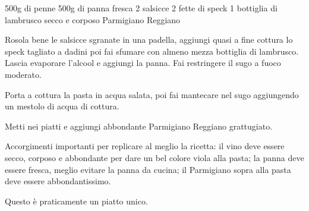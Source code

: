 \begin{ingreds}
	500g di penne
	500g di panna fresca
	2 salsicce
	2 fette di speck
	1 bottiglia di lambrusco secco e corposo
	Parmigiano Reggiano

\end{ingreds}

\begin{method}
Rosola bene le salsicce sgranate in una padella, aggiungi quasi a fine cottura lo speck tagliato a dadini poi fai sfumare con almeno mezza bottiglia di lambrusco. Lascia evaporare l'alcool e aggiungi la panna. Fai restringere il sugo a fuoco moderato.

Porta a cottura la pasta in acqua salata, poi fai mantecare nel sugo aggiungendo un mestolo di acqua di cottura.

Metti nei piatti e aggiungi abbondante Parmigiano Reggiano grattugiato.

\end{method}

\begin{note}
	Accorgimenti importanti per replicare al meglio la ricetta: il vino deve essere secco, corposo e abbondante per dare un bel colore viola alla pasta; la panna deve essere fresca, meglio evitare la panna da cucina; il Parmigiano sopra alla pasta deve essere abbondantissimo.

	Questo è praticamente un piatto unico.
\end{note}


